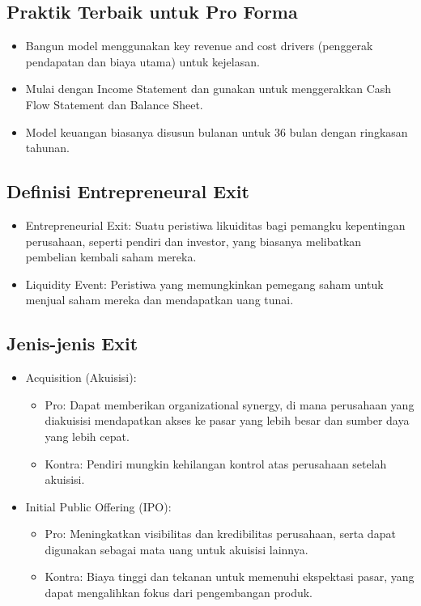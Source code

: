\documentclass{article}
\begin{document}
\subsection{Praktik Terbaik untuk Pro Forma}
\begin{itemize}
    \item Bangun model menggunakan key revenue and cost drivers (penggerak pendapatan dan biaya utama) untuk kejelasan.
    \item Mulai dengan Income Statement dan gunakan untuk menggerakkan Cash Flow Statement dan Balance Sheet.
    \item Model keuangan biasanya disusun bulanan untuk 36 bulan dengan ringkasan tahunan.
\end{itemize}

\subsection{Definisi Entrepreneural Exit}
\begin{itemize}
    \item Entrepreneurial Exit: Suatu peristiwa likuiditas bagi pemangku kepentingan perusahaan, seperti pendiri dan investor, yang biasanya melibatkan pembelian kembali saham mereka.
    \item Liquidity Event: Peristiwa yang memungkinkan pemegang saham untuk menjual saham mereka dan mendapatkan uang tunai.
\end{itemize}

\subsection{Jenis-jenis Exit}
\begin{itemize}
    \item Acquisition (Akuisisi):
          \begin{itemize}
              \item Pro: Dapat memberikan organizational synergy, di mana perusahaan yang diakuisisi mendapatkan akses ke pasar yang lebih besar dan sumber daya yang lebih cepat.
              \item Kontra: Pendiri mungkin kehilangan kontrol atas perusahaan setelah akuisisi.
          \end{itemize}
    \item Initial Public Offering (IPO):
          \begin{itemize}
              \item Pro: Meningkatkan visibilitas dan kredibilitas perusahaan, serta dapat digunakan sebagai mata uang untuk akuisisi lainnya.
              \item Kontra: Biaya tinggi dan tekanan untuk memenuhi ekspektasi pasar, yang dapat mengalihkan fokus dari pengembangan produk.
          \end{itemize}
\end{itemize}
\end{document}
